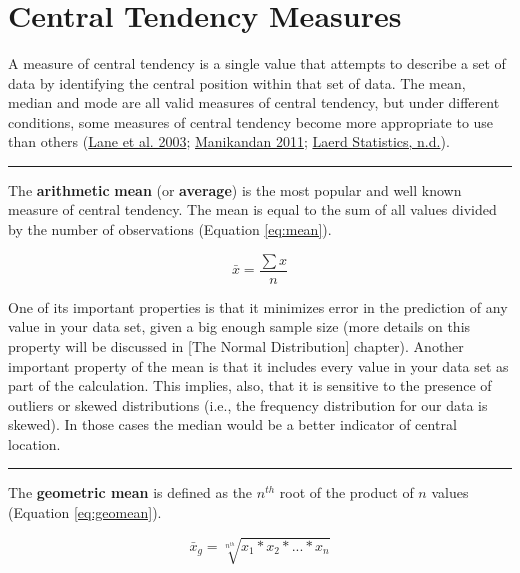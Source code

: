 \documentclass[
]{svmono}
\begin{document}
~

~

~

\hypertarget{central-tendency-measures}{%
\section{Central Tendency Measures}\label{central-tendency-measures}}

A measure of central tendency is a single value that attempts to
describe a set of data by identifying the central position within that
set of data. The mean, median and mode are all valid measures of central
tendency, but under different conditions, some measures of central
tendency become more appropriate to use than others (\protect\hyperlink{ref-lane2003}{Lane et al. 2003}; \protect\hyperlink{ref-manikandan2011}{Manikandan 2011}; \protect\hyperlink{ref-laerdstatistics}{Laerd Statistics, n.d.}).

\begin{center}\rule{0.5\linewidth}{0.5pt}\end{center}

The \textbf{arithmetic} \textbf{mean} (or \textbf{average}) is the most popular and
well known measure of central tendency. The mean is equal to the sum of
all values divided by the number of observations (Equation
\eqref{eq:mean}).

\begin{equation}
\bar x = \frac{\sum{x}}{n}
\label{eq:mean}
\end{equation}

One of its important properties is that it minimizes error in the
prediction of any value in your data set, given a big enough sample size
(more details on this property will be discussed in {[}The Normal
Distribution{]} chapter). Another important property of the mean is that
it includes every value in your data set as part of the calculation.
This implies, also, that it is sensitive to the presence of outliers or
skewed distributions (i.e., the frequency distribution for our data is
skewed). In those cases the median would be a better indicator of
central location.

\begin{center}\rule{0.5\linewidth}{0.5pt}\end{center}

The \textbf{geometric mean} is defined as the \(n^{th}\) root of the product of
\(n\) values (Equation \eqref{eq:geomean}).

\begin{equation}
\bar x_{g} = \sqrt[n^{th}]{x_1*x_2*...*x_n}
\label{eq:geomean}
\end{equation}
\end{document}
